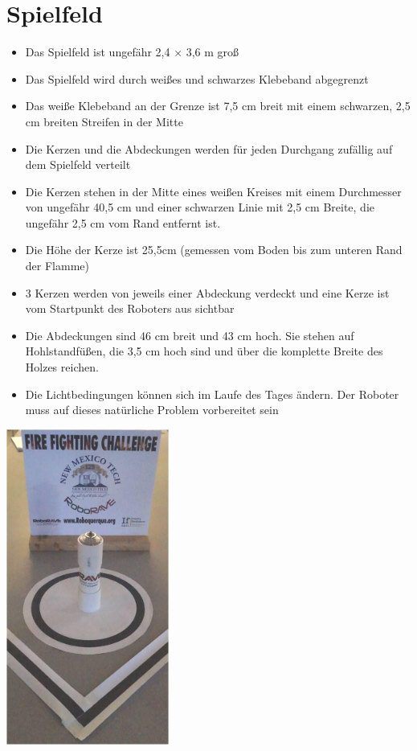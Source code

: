 \documentclass[a4paper,12pt]{article}
\begin{document}
\section{Spielfeld}
\begin{itemize}
\item Das Spielfeld ist ungefähr 2,4 × 3,6 m groß
\item Das Spielfeld wird durch weißes und schwarzes Klebeband abgegrenzt
\item Das weiße Klebeband an der Grenze ist 7,5 cm breit mit einem schwarzen, 2,5 cm
breiten Streifen in der Mitte
\item Die Kerzen und die Abdeckungen werden für jeden Durchgang zufällig auf dem
Spielfeld verteilt
\item Die Kerzen stehen in der Mitte eines weißen Kreises mit einem Durchmesser von
ungefähr 40,5 cm und einer schwarzen Linie mit 2,5 cm Breite, die ungefähr 2,5 cm
vom Rand entfernt ist.
\item Die Höhe der Kerze ist 25,5cm (gemessen vom Boden bis zum unteren Rand der
Flamme)
\item 3 Kerzen werden von jeweils einer Abdeckung verdeckt und eine Kerze ist vom Startpunkt des Roboters aus
sichtbar
\item Die Abdeckungen sind 46 cm breit und 43 cm hoch. Sie stehen auf Hohlstandfüßen, die 3,5 cm hoch sind und
über die komplette Breite des Holzes reichen.
\item Die Lichtbedingungen können sich im Laufe des Tages ändern. Der Roboter muss auf dieses natürliche
Problem vorbereitet sein
\end{itemize}
\begin{center}
\includegraphics[width=0.4\textwidth]{candle.jpeg}
\end{center}
\end{document}
